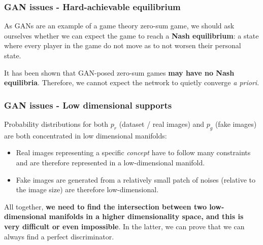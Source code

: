 \begin{frame}
    \frametitle{GAN issues - Hard-achievable equilibrium}
    As GANs are an example of a game theory zero-sum game, we should ask ourselves whether we can expect the game to reach a \textbf{Nash equilibrium}: a state where every player in the game do not move as to not worsen their personal state.

    It has been shown that GAN-posed zero-sum games \textbf{may have no Nash equilibria}. Therefore, we cannot expect the network to quietly converge \emph{a priori}.
\end{frame}

\begin{frame}
    \frametitle{GAN issues - Low dimensional supports}
    Probability distributions for both $p_r$ (dataset / real images) and $p_g$ (fake images) are both concentrated in low dimensional manifolds:
    \begin{itemize}
        \item Real images representing a specific \emph{concept} have to follow many constraints and are therefore represented in a low-dimensional manifold.
        \item Fake images are generated from a relatively small patch of noises (relative to the image size) are therefore low-dimensional.
    \end{itemize}
    All together, \textbf{we need to find the intersection between two low-dimensional manifolds in a higher dimensionality space, and this is very difficult or even impossible}. In the latter, we can prove that we can always find a perfect discriminator.
\end{frame}
